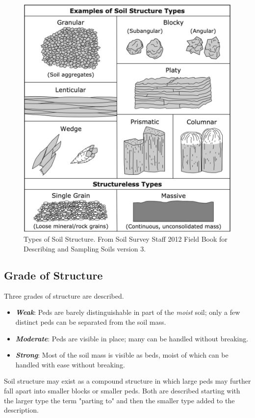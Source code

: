 \documentclass{article}
\begin{document}
\begin{figure}
    \centering
    \includegraphics[width=0.8\columnwidth]{images/FieldBookVer3_ExamplesSoilStructureTypes1045x1145.png}
    \caption{Types of Soil Structure. From Soil Survey Staff 2012 Field Book for Describing and Sampling Soils version 3.}
    \label{fig:SoilStructureTypes}
\end{figure}

\subsection{Grade of Structure}
    
Three grades of structure are described.

\begin{itemize}
    \item \textbf{\textit{Weak}}: Peds are barely distinguishable in part of the \textit{moist} soil; only a few distinct peds can be separated from the soil mass.
    \item \textbf{\textit{Moderate}}: Peds are visible in place; many can be handled without breaking.
    \item \textbf{\textit{Strong}}: Most of the soil mass is visible as beds, moist of which can be handled with ease without breaking.
\end{itemize}

Soil structure may exist as a compound structure in which large peds may further fall apart into smaller blocks or smaller peds. Both are described starting with the larger type the term "parting to" and then the smaller type added to the description.
    
\end{document}
